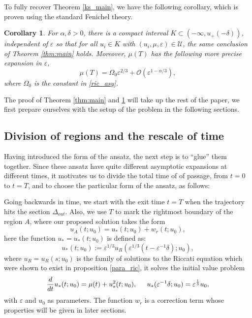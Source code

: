 \documentclass[letterpaper,11pt]{article}
\newcommand{\rmO}{\mathcal{O}}
\newcommand{\eps}{\varepsilon}
\numberwithin{equation}{section}
\theoremstyle{plain}
\newtheorem{corollary}[theorem]{Corollary}
\begin{document}
To fully recover Theorem \ref{ks_main}, we have  the following corollary, which is proven using the standard Fenichel theory.
\begin{corollary}\label{cor:main}
For $\alpha,\delta>0$, there is a compact interval $K \subset (-\infty, u_+(-\delta))$, independent of $\eps$ so that for all $u_i \in K$ with $(u_i,\mu,\eps) \in \mathcal{U}$, the same conclusion of Theorem \ref{thm:main} holds. Moreover, $\mu(T)$ has the following more precise expansion in $\eps$,
\begin{equation}\label{T_exp_+}
\mu(T)  = \Omega_0\eps^{2/3} + \rmO(\eps^{1-\alpha/3}),
\end{equation}
where $\Omega_0$ is the constant in \eqref{ric_asy}.
\end{corollary}

 The proof of Theorem \ref{thm:main} and \ref{cor:main} will take up the rest of the paper,  we first prepare ourselves with the setup of the problem in the following sections.

\subsection{Division of regions and the rescale of time}\label{t_sigma}

Having introduced the form of the ansatz, the next step is to ``glue'' them together. Since these ansatz have quite different asymptotic expansions at different times, it motivates us to divide the total time of of passage, from $t=0$ to $t=T$, and to choose the particular form of the ansatz, as follows:

Going backwards in time, we start with the exit time $t=T$ when the trajectory hits the section $\Delta_{out}$. Also, we use $T$ to mark the rightmost boundary of the region $A$, where our proposed solution takes the form
\[
u_A(t; u_0) = u_*(t;u_0)  + w_r(t;u_0),
\]
here the function $u_* = u_*(t; u_0)$ is defined as:
\begin{equation}\label{urdef}
u_*(t; u_0) := \eps^{1/3}u_R(\eps^{1/3}(t-\eps^{-1}\delta); u_0),
\end{equation}
where $u_R=u_R(s; u_0)$ is the family of solutions to the Riccati equation which were shown to exist in proposition \ref{para_ric}, it solves the initial value problem
\begin{equation}\label{ureq}
\frac{d}{dt}u_*(t; u_0) = \mu(t) + u_*^2(t; u_0), \hspace{0.2in} u_*(\eps^{-1}\delta; u_0) = \eps^{\frac{1}{3}} u_0,
\end{equation}
with $\eps$ and $u_0$ as parameters.  The function $w_r$ is a correction term whose properties will be given in later sections. 
\end{document}
